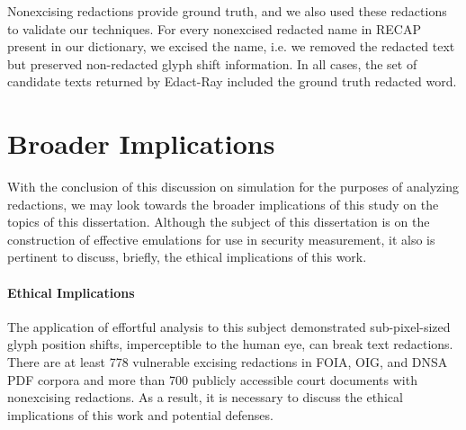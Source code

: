 Nonexcising redactions provide ground truth, and we also used these redactions to validate our techniques.
For every nonexcised redacted name in RECAP present in our dictionary, we excised the name, i.e. we removed the redacted text but preserved non-redacted glyph shift information.
In all cases, the set of candidate texts returned by Edact-Ray included the ground truth redacted word.

\section{Broader Implications}

With the conclusion of this discussion on simulation for the purposes of analyzing redactions, we may look towards the broader implications of this study on the topics of this dissertation.
Although the subject of this dissertation is on the construction of effective emulations for use in security measurement, it also is pertinent to discuss, briefly, the ethical implications of this work.

\paragraph{Ethical Implications}
\label{sec:redaction-ethics}

The application of effortful analysis to this subject demonstrated sub-pixel-sized glyph position shifts, imperceptible to the human eye, can break text redactions.
There are at least 778 vulnerable excising redactions in FOIA, OIG, and DNSA PDF corpora and more than 700 publicly accessible court documents with nonexcising redactions.
As a result, it is necessary to discuss the ethical implications of this work and potential defenses.

